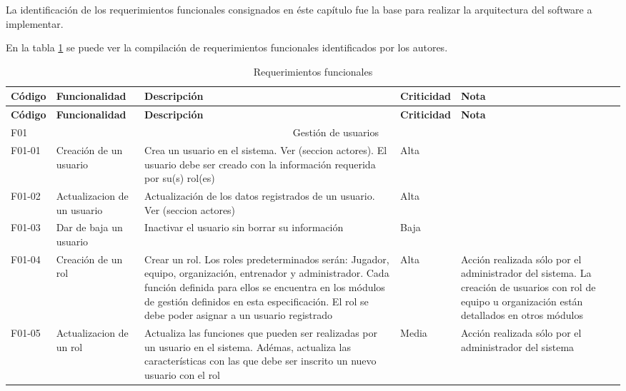La identificación de los requerimientos funcionales consignados en éste capítulo fue la base para realizar la arquitectura del software a implementar.

En la tabla \ref{tab:requerimientos_funcionales} se puede ver la compilación de requerimientos funcionales identificados por los autores.

	\begin{center}
		\begin{longtable}{|p{1.5cm}|p{3cm}|p{5cm}|p{2cm}|p{3cm}|}
			\caption{Requerimientos funcionales \label{tab:requerimientos_funcionales}} \\		
			\hline
			\textbf{Código} & \textbf{Funcionalidad} & \textbf{Descripción} & \textbf{Criticidad} & \textbf{Nota} \\
			\hline
			\endfirsthead
			\hline
			\textbf{Código} & \textbf{Funcionalidad} & \textbf{Descripción} & \textbf{Criticidad} & \textbf{Nota} \\
			\hline
			\endhead
			\hline
			\endfoot
			\hline
			\endlastfoot
			F01 & 
			\multicolumn{4}{c|}{Gestión de usuarios} \\
			\hline
			F01-01 & 
			Creación de un usuario & 
			Crea un usuario en el sistema. Ver (seccion actores). El usuario debe ser creado con la información requerida por su(s) rol(es) & 
			Alta & 
			\\
			\hline
			F01-02 & 
			Actualizacion de un usuario & 
			Actualización de los datos registrados de un usuario. Ver (seccion actores) & 
			Alta & 
			\\
			\hline
			F01-03 & 
			Dar de baja un usuario & 
			Inactivar el usuario sin borrar su información & 
			Baja & 
			\\
			\hline
			F01-04 & 
			Creación de un rol & 
			Crear un rol. Los roles predeterminados serán: Jugador, equipo, organización, entrenador y administrador. Cada función definida para ellos se encuentra en los módulos de gestión definidos en esta especificación. El rol se debe poder asignar a un usuario registrado & 
			Alta & 
			Acción realizada sólo por el administrador del sistema. La creación de usuarios con rol de equipo u organización están detallados en otros módulos \\
			\hline
			F01-05 & 
			Actualizacion de un rol & 
			Actualiza las funciones que pueden ser realizadas por un usuario en el sistema. Adémas, actualiza las características con las que debe ser inscrito un nuevo usuario con el rol & 
			Media & 
			Acción realizada sólo por el administrador del sistema\\

\end{longtable}
\end{center}
